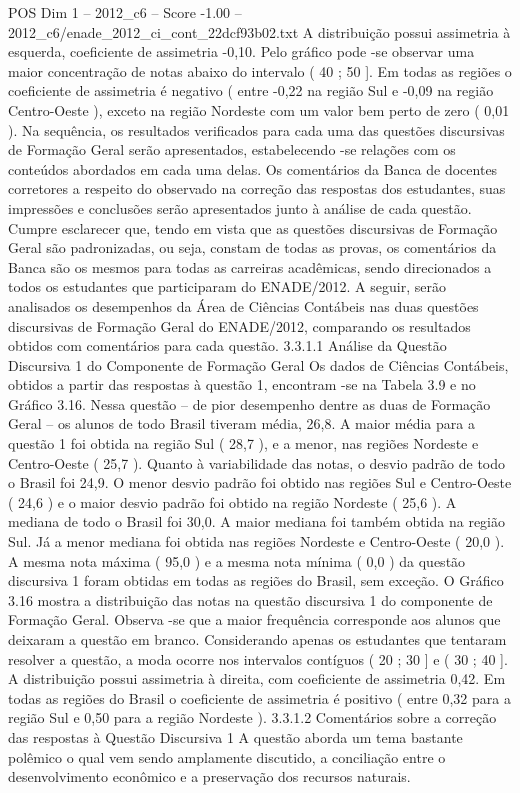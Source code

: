 \begin{textsample}{POS Dim 1 – 2012\_c6 – Score -1.00 – 2012\_c6/enade\_2012\_ci\_cont\_22dcf93b02.txt}
A distribuição possui assimetria à esquerda, coeficiente de assimetria -0,10.
Pelo gráfico pode -se observar uma maior concentração de notas abaixo do intervalo ( 40 ; 50 ].
Em todas as regiões o coeficiente de assimetria é negativo ( entre -0,22 na região Sul e -0,09 na região Centro-Oeste ), exceto na região Nordeste com um valor bem perto de zero ( 0,01 ).
Na sequência, os resultados verificados para cada uma das questões discursivas de Formação Geral serão apresentados, estabelecendo -se relações com os conteúdos abordados em cada uma delas.
Os comentários da Banca de docentes corretores a respeito do observado na correção das respostas dos estudantes, suas impressões e conclusões serão apresentados junto à análise de cada questão.
Cumpre esclarecer que, tendo em vista que as questões discursivas de Formação Geral são padronizadas, ou seja, constam de todas as provas, os comentários da Banca são os mesmos para todas as carreiras acadêmicas, sendo direcionados a todos os estudantes que participaram do ENADE/2012.
A seguir, serão analisados os desempenhos da Área de Ciências Contábeis nas duas questões discursivas de Formação Geral do ENADE/2012, comparando os resultados obtidos com comentários para cada questão. 3.3.1.1 Análise da Questão Discursiva 1 do Componente de Formação Geral Os dados de Ciências Contábeis, obtidos a partir das respostas à questão 1, encontram -se na Tabela 3.9 e no Gráfico 3.16.
Nessa questão – de pior desempenho dentre as duas de Formação Geral – os alunos de todo Brasil tiveram média, 26,8.
A maior média para a questão 1 foi obtida na região Sul ( 28,7 ), e a menor, nas regiões Nordeste e Centro-Oeste ( 25,7 ).
Quanto à variabilidade das notas, o desvio padrão de todo o Brasil foi 24,9.
O menor desvio padrão foi obtido nas regiões Sul e Centro-Oeste ( 24,6 ) e o maior desvio padrão foi obtido na região Nordeste ( 25,6 ).
A mediana de todo o Brasil foi 30,0.
A maior mediana foi também obtida na região Sul.
Já a menor mediana foi obtida nas regiões Nordeste e Centro-Oeste ( 20,0 ).
A mesma nota máxima ( 95,0 ) e a mesma nota mínima ( 0,0 ) da questão discursiva 1 foram obtidas em todas as regiões do Brasil, sem exceção.
O Gráfico 3.16 mostra a distribuição das notas na questão discursiva 1 do componente de Formação Geral.
Observa -se que a maior frequência corresponde aos alunos que deixaram a questão em branco.
Considerando apenas os estudantes que tentaram resolver a questão, a moda ocorre nos intervalos contíguos ( 20 ; 30 ] e ( 30 ; 40 ].
A distribuição possui assimetria à direita, com coeficiente de assimetria 0,42.
Em todas as regiões do Brasil o coeficiente de assimetria é positivo ( entre 0,32 para a região Sul e 0,50 para a região Nordeste ). 3.3.1.2 Comentários sobre a correção das respostas à Questão Discursiva 1 A questão aborda um tema bastante polêmico o qual vem sendo amplamente discutido, a conciliação entre o desenvolvimento econômico e a preservação dos recursos naturais.

\end{textsample}
